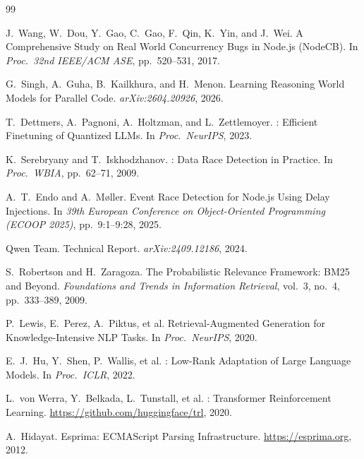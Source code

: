\documentclass[runningheads]{llncs}
\begin{document}
\begin{thebibliography}{99}

  J.\ Wang, W.\ Dou, Y.\ Gao, C.\ Gao, F.\ Qin, K.\ Yin, and
  J.\ Wei.
  \newblock A Comprehensive Study on Real World Concurrency Bugs in
  {Node.js} ({NodeCB}).
  \newblock In \emph{Proc.\ 32nd IEEE/ACM ASE}, pp.\ 520--531, 2017.

  G.\ Singh, A.\ Guha, B.\ Kailkhura, and H.\ Menon.
  \newblock Learning Reasoning World Models for Parallel Code.
  \newblock \emph{arXiv:2604.20926}, 2026.

  T.\ Dettmers, A.\ Pagnoni, A.\ Holtzman, and L.\ Zettlemoyer.
  : Efficient Finetuning of Quantized LLMs.
  \newblock In \emph{Proc.\ NeurIPS}, 2023.

  K.\ Serebryany and T.\ Iskhodzhanov.
  : Data Race Detection in Practice.
  \newblock In \emph{Proc.\ WBIA}, pp.\ 62--71, 2009.

  A.\ T.\ Endo and A.\ M{\o}ller.
  \newblock Event Race Detection for {Node.js} Using Delay Injections.
  \newblock In \emph{39th European Conference on Object-Oriented Programming (ECOOP 2025)}, pp.\ 9:1--9:28, 2025.

  Qwen Team.
   Technical Report.
  \newblock \emph{arXiv:2409.12186}, 2024.

  S.\ Robertson and H.\ Zaragoza.
  \newblock The Probabilistic Relevance Framework: BM25 and Beyond.
  \newblock \emph{Foundations and Trends in Information Retrieval},
  vol.\ 3, no.\ 4, pp.\ 333--389, 2009.

  P.\ Lewis, E.\ Perez, A.\ Piktus, et al.
  \newblock Retrieval-Augmented Generation for Knowledge-Intensive NLP Tasks.
  \newblock In \emph{Proc.\ NeurIPS}, 2020.

  E.\ J.\ Hu, Y.\ Shen, P.\ Wallis, et al.
  : Low-Rank Adaptation of Large Language Models.
  \newblock In \emph{Proc.\ ICLR}, 2022.

  L.\ von Werra, Y.\ Belkada, L.\ Tunstall, et al.
  : Transformer Reinforcement Learning.
  \newblock \url{https://github.com/huggingface/trl}, 2020.

  A.\ Hidayat.
  \newblock Esprima: ECMAScript Parsing Infrastructure.
  \newblock \url{https://esprima.org}, 2012.


\end{thebibliography}
\end{document}
